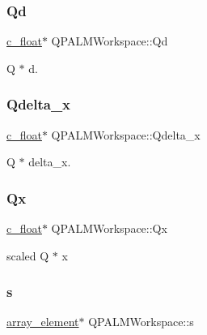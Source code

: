 \subsubsection{\texorpdfstring{Qd}{Qd}}
{\footnotesize\ttfamily \mbox{\hyperlink{global__opts_8h_a7f1a9fda95e52979658c20a0d134fb15}{c\+\_\+float}}$\ast$ Q\+P\+A\+L\+M\+Workspace\+::\+Qd}



Q $\ast$ d. 

\mbox{\label{structQPALMWorkspace_a7a10abcbd6a5e3cb44b7dca2cf679c7a}} 
\subsubsection{\texorpdfstring{Qdelta\_x}{Qdelta\_x}}
{\footnotesize\ttfamily \mbox{\hyperlink{global__opts_8h_a7f1a9fda95e52979658c20a0d134fb15}{c\+\_\+float}}$\ast$ Q\+P\+A\+L\+M\+Workspace\+::\+Qdelta\+\_\+x}



Q $\ast$ delta\+\_\+x. 

\mbox{\label{structQPALMWorkspace_a9104271b5dc1b242f3d6d5c175dcb0c1}} 
\subsubsection{\texorpdfstring{Qx}{Qx}}
{\footnotesize\ttfamily \mbox{\hyperlink{global__opts_8h_a7f1a9fda95e52979658c20a0d134fb15}{c\+\_\+float}}$\ast$ Q\+P\+A\+L\+M\+Workspace\+::\+Qx}



scaled Q $\ast$ x 

\mbox{\label{structQPALMWorkspace_a6428bf5b44e920828469514559b93de8}} 
\subsubsection{\texorpdfstring{s}{s}}
{\footnotesize\ttfamily \mbox{\hyperlink{structarray__element}{array\+\_\+element}}$\ast$ Q\+P\+A\+L\+M\+Workspace\+::s}



